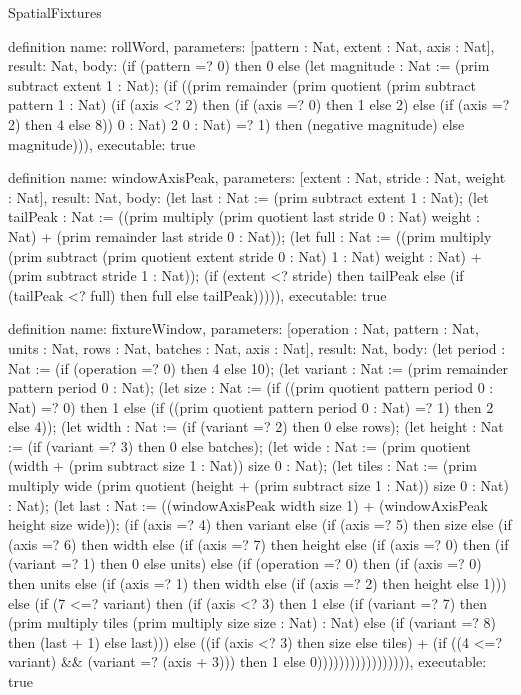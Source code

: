 \begin{lexlean}{SpatialFixtures}
\begin{semanticmodule}
definition{
  name: rollWord,
  parameters: [pattern : Nat, extent : Nat, axis : Nat],
  result: Nat,
  body: (if (pattern =? 0) then 0 else (let magnitude : Nat := (prim subtract extent 1 : Nat); (if ((prim remainder (prim quotient (prim subtract pattern 1 : Nat) (if (axis <? 2) then (if (axis =? 0) then 1 else 2) else (if (axis =? 2) then 4 else 8)) 0 : Nat) 2 0 : Nat) =? 1) then (negative magnitude) else magnitude))),
  executable: true
}

definition{
  name: windowAxisPeak,
  parameters: [extent : Nat, stride : Nat, weight : Nat],
  result: Nat,
  body: (let last : Nat := (prim subtract extent 1 : Nat);
      (let tailPeak : Nat := ((prim multiply (prim quotient last stride 0 : Nat) weight : Nat) + (prim remainder last stride 0 : Nat));
      (let full : Nat := ((prim multiply (prim subtract (prim quotient extent stride 0 : Nat) 1 : Nat) weight : Nat) + (prim subtract stride 1 : Nat));
      (if (extent <? stride) then tailPeak else (if (tailPeak <? full) then full else tailPeak))))),
  executable: true
}

definition{
  name: fixtureWindow,
  parameters: [operation : Nat, pattern : Nat, units : Nat, rows : Nat, batches : Nat, axis : Nat],
  result: Nat,
  body: (let period : Nat := (if (operation =? 0) then 4 else 10);
      (let variant : Nat := (prim remainder pattern period 0 : Nat);
      (let size : Nat := (if ((prim quotient pattern period 0 : Nat) =? 0) then 1 else (if ((prim quotient pattern period 0 : Nat) =? 1) then 2 else 4));
      (let width : Nat := (if (variant =? 2) then 0 else rows);
      (let height : Nat := (if (variant =? 3) then 0 else batches);
      (let wide : Nat := (prim quotient (width + (prim subtract size 1 : Nat)) size 0 : Nat);
      (let tiles : Nat := (prim multiply wide (prim quotient (height + (prim subtract size 1 : Nat)) size 0 : Nat) : Nat);
      (let last : Nat := ((windowAxisPeak width size 1) + (windowAxisPeak height size wide));
      (if (axis =? 4) then variant else (if (axis =? 5) then size else (if (axis =? 6) then width else (if (axis =? 7) then height else (if (axis =? 0) then (if (variant =? 1) then 0 else units) else (if (operation =? 0) then (if (axis =? 0) then units else (if (axis =? 1) then width else (if (axis =? 2) then height else 1))) else (if (7 <=? variant) then (if (axis <? 3) then 1 else (if (variant =? 7) then (prim multiply tiles (prim multiply size size : Nat) : Nat) else (if (variant =? 8) then (last + 1) else last))) else ((if (axis <? 3) then size else tiles) + (if ((4 <=? variant) && (variant =? (axis + 3))) then 1 else 0))))))))))))))))),
  executable: true
}


\end{semanticmodule}
\end{lexlean}
